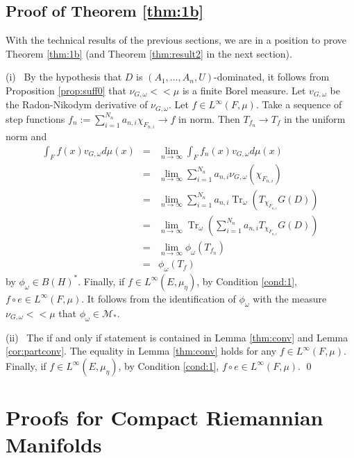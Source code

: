 \documentclass[final,1p]{elsarticle}
\numberwithin{equation}{section}
\theoremstyle{plain}
\theoremstyle{definition}
\newcounter{prop2count}
\begin{document}
\subsection{Proof of Theorem \ref{thm:1b}} \label{sec:4}

With the technical results of the previous sections, we are in a position to prove Theorem \ref{thm:1b} (and Theorem \ref{thm:result2} in the next section).

\medskip (i) \ By the hypothesis that $D$ is $(A_1,\ldots,A_n,U)$-dominated, it follows 
from Proposition \ref{prop:suff0} that
$\nu_{G,\omega} {\ensuremath{\! < \! \! < \!}} \mu$ is a finite Borel measure.  Let
$v_{G,\omega}$ be the Radon-Nikodym derivative of $\nu_{G,\omega}$.
Let $f \in L^\infty(F,\mu)$.  Take a sequence of step functions
$f_{n} := \sum_{i=1}^{N_n} a_{n,i} \chi_{F_{n,i}} \to f$ in norm.  Then $T_{f_n} \to T_f$ in the uniform norm and
\begin{eqnarray*}
\int_F f(x) v_{G,\omega} d\mu(x) & = & \lim_{n \to \infty} \int_F f_n(x) v_{G,\omega} d\mu(x) \\
& = & \lim_{n \to \infty} \sum_{i=1}^{N_n} a_{n,i} \nu_{G,\omega}(\chi_{F_{n,i}}) \\
& = & \lim_{n \to \infty} \sum_{i=1}^{N_n} a_{n,i} \operatorname{Tr}_{\omega}(T_{\chi_{F_{n,i}}}G(D)) \\
& = & \lim_{n \to \infty}  \operatorname{Tr}_{\omega}(\sum_{i=1}^{N_n} a_{n,i} T_{\chi_{F_{n,i}}}G(D)) \\
& = & \lim_{n \to \infty}  \phi_{\omega}(T_{f_n}) \\
& = & \phi_{\omega}(T_{f}) 
\end{eqnarray*}
by $\phi_\omega \in B(H)^*$.  Finally, if $f \in L^\infty(E,\mu_\eta)$, by Condition \ref{cond:1}, $f \circ e \in L^\infty(F,\mu)$.  It follows from the identification
of $\phi_\omega$ with the measure $\nu_{G,\omega} {\ensuremath{\! < \! \! < \!}} \mu$ that $\phi_\omega \in \mathcal{M}_*$.

\medskip \noindent (ii) \ The if and only if statement is contained in
Lemma \ref{thm:conv} and Lemma \ref{cor:partconv}. The equality in
Lemma \ref{thm:conv} holds
for any $f \in L^\infty(F,\mu)$.
Finally, if $f \in L^\infty(E,\mu_\eta)$, by Condition \ref{cond:1},
$f \circ e \in L^\infty(F,\mu)$.
\qed

\section{Proofs for Compact Riemannian Manifolds} \label{sec:5}
\end{document}

